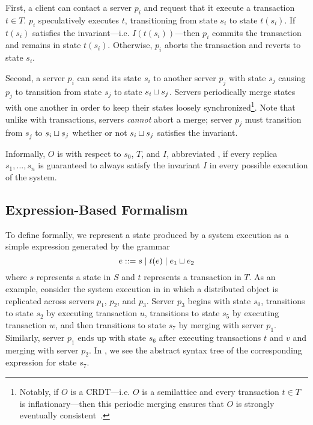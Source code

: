 First, a client can contact a server $p_i$ and request that it execute a
transaction $t \in T$. $p_i$ speculatively executes $t$, transitioning from
state $s_i$ to state $t(s_i)$. If $t(s_i)$ satisfies the invariant---i.e.
$I(t(s_i))$---then $p_i$ commits the transaction and remains in state $t(s_i)$.
Otherwise, $p_i$ aborts the transaction and reverts to state $s_i$.

Second, a server $p_i$ can send its state $s_i$ to another server $p_j$ with
state $s_j$ causing $p_j$ to transition from state $s_j$  to state $s_i \sqcup
s_j$. Servers periodically merge states with one another in order to keep their
states loosely synchronized\footnote{%
  Notably, if $O$ is a CRDT---i.e. $O$ is a semilattice and every transaction
  $t \in T$ is inflationary---then this periodic merging ensures that $O$ is
  strongly eventually consistent~\cite{shapiro2011conflict}.
}.
Note that unlike with transactions, servers \emph{cannot} abort a merge; server
$p_j$ must transition from $s_j$ to $s_i \sqcup s_j$ whether or not $s_i \sqcup
s_j$ satisfies the invariant.

Informally, $O$ is  with respect to $s_0$, $T$,
and $I$, abbreviated , if every replica $s_1, \ldots,
s_n$ is guaranteed to always satisfy the invariant $I$ in every possible
execution of the system.

\subsection{Expression-Based Formalism}
To define \invariantconfluence{} formally, we represent a state produced by a
system execution as a simple expression generated by the grammar
\[
  e ::= s \mid t(e) \mid e_1 \sqcup e_2
\]
where $s$ represents a state in $S$ and $t$ represents a transaction in $T$. As
an example, consider the system execution in  in which
a distributed object is replicated across servers $p_1$, $p_2$, and $p_3$.
Server $p_3$ begins with state $s_0$, transitions to state $s_2$ by executing
transaction $u$, transitions to state $s_5$ by executing transaction $w$, and
then transitions to state $s_7$ by merging with server $p_1$. Similarly, server
$p_1$ ends up with state $s_6$ after executing transactions $t$ and $v$ and
merging with server $p_2$. In , we see the abstract syntax
tree of the corresponding expression for state $s_7$.

{}

